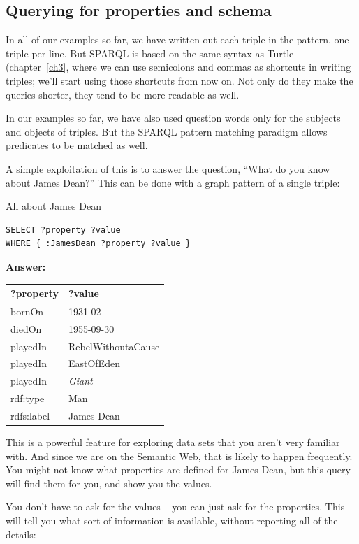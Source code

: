 \subsection{Querying for properties and schema}

In all of our examples so far, we have written out each triple in the pattern, one triple per line.  
But SPARQL is based on the same syntax as Turtle (chapter~\ref{ch3}, where we can use semicolons and commas as shortcuts
in writing triples; we'll start using those shortcuts from now on.  Not only do they make the queries shorter, they
tend to be more readable as well. 

In our examples so far, 
we have also used question words only for the
subjects and objects of triples. But the SPARQL pattern matching
paradigm allows predicates to be matched as well.

A simple exploitation of this is to answer the question, ``What do you
know about James Dean?'' This can be done with a graph pattern of a
single triple:

\begin{query}All about James Dean\end{query}

\begin{lstlisting}
SELECT ?property ?value
WHERE { :JamesDean ?property ?value }
\end{lstlisting}

\textbf{\textbf{Answer:}}

\begin{tabular}{|ll|}
\hline
?property&?value\\
\hline
bornOn&1931-02-\\
diedOn&1955-09-30\\
playedIn&RebelWithoutaCause\\
playedIn&EastOfEden\\
playedIn&\emph{Giant}\\
rdf:type&Man\\
rdfs:label&James Dean\\
\hline
\end{tabular}


This is a powerful feature for exploring data sets that you aren't very
familiar with. And since we are on the Semantic Web, that is likely to
happen frequently. You might not know what properties are defined for
James Dean, but this query will find them for you, and show you the
values.

You don't have to ask for the values -- you can just ask for the
properties. This will tell you what sort of information is available,
without reporting all of the details:

